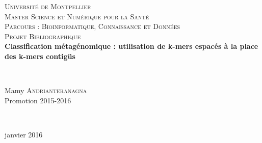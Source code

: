 \begin{titlepage}
  \begin{sffamily}
  \begin{center}


    \textsc{\LARGE Université de Montpellier}\\[2cm]

    \textsc{\Large Master Science et Numérique pour la Santé}\\[0.5cm]
		
		\textsc{\Large Parcours : Bioinformatique, Connaissance et Données}\\[3cm]
		
		\textsc{\Large Projet Bibliographique }\\[1.5cm]


    { \huge \bfseries Classification métagénomique : utilisation de k-mers espacés à la place des k-mers contigüs\\[0.1cm] }

    \HRule \\[3cm]


    \begin{minipage}{0.8\textwidth}
      \begin{centering} \large
        Mamy \textsc{Andrianteranagna}\\
        Promotion 2015-2016\\
      \end{centering}
    \end{minipage}\\[3cm]

    \vfill

    
    {\large janvier 2016}

  \end{center}
  \end{sffamily}
\end{titlepage}

